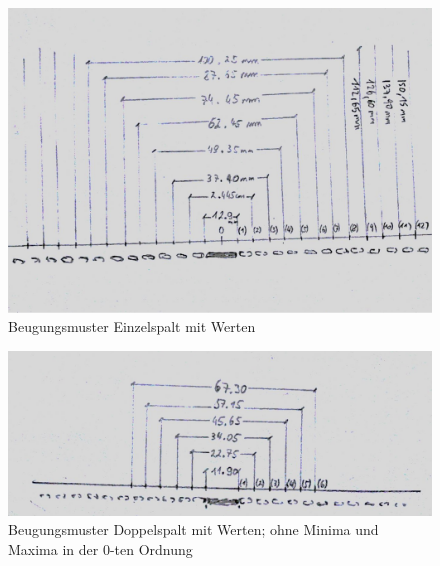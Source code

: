 \documentclass[12pt,a4paper]{article}
\begin{document}
\begin{figure}[H]
	\centering
	\includegraphics[scale=0.9]{./figure/einzelspalt_beugung.png}
	\caption{Beugungsmuster Einzelspalt mit Werten}
	\label{fig:messwerte_einzelspalt}
\end{figure}
\begin{figure}[H]
	\centering
	\includegraphics[scale=0.9]{./figure/doppelspalt_beugung.png}
	\caption{Beugungsmuster Doppelspalt mit Werten; ohne Minima und Maxima in der 0-ten Ordnung}
	\label{fig:messwerte_doppelspalt}
\end{figure}
\end{document}
